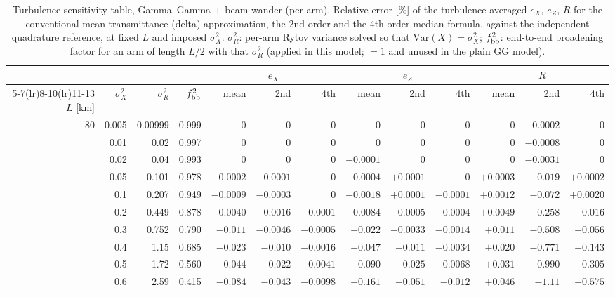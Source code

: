 \documentclass[11pt,a4paper]{article}
\begin{document}
\begin{table}[htbp]
\centering\scriptsize
\caption{Turbulence-sensitivity table, Gamma--Gamma + beam wander (per arm). Relative error [\%] of the turbulence-averaged $e_X$, $e_Z$, $R$ for the conventional mean-transmittance (delta) approximation, the 2nd-order and the 4th-order median formula, against the independent quadrature reference, at fixed $L$ and imposed $\sigma_X^2$. $\sigma_R^2$: per-arm Rytov variance solved so that $\mathrm{Var}(X)=\sigma_X^2$; $f_{\rm bb}^2$: end-to-end broadening factor for an arm of length $L/2$ with that $\sigma_R^2$ (applied in this model; $=1$ and unused in the plain GG model).}
\label{tab:sens-GGBB}
\begin{tabular}{rrrrrrrrrrrrr}
\toprule
 & & & & \multicolumn{3}{c}{$e_X$} & \multicolumn{3}{c}{$e_Z$} & \multicolumn{3}{c}{$R$}\\
\cmidrule(lr){5-7}\cmidrule(lr){8-10}\cmidrule(lr){11-13}
$L$ [km] & $\sigma_X^2$ & $\sigma_R^2$ & $f_{\rm bb}^2$ & mean & 2nd & 4th & mean & 2nd & 4th & mean & 2nd & 4th\\
\midrule
80 & 0.005 & 0.00999 & 0.999 & $0$ & $0$ & $0$ & $0$ & $0$ & $0$ & $0$ & $-0.0002$ & $0$ \\
 & 0.01 & 0.02 & 0.997 & $0$ & $0$ & $0$ & $0$ & $0$ & $0$ & $0$ & $-0.0008$ & $0$ \\
 & 0.02 & 0.04 & 0.993 & $0$ & $0$ & $0$ & $-0.0001$ & $0$ & $0$ & $0$ & $-0.0031$ & $0$ \\
 & 0.05 & 0.101 & 0.978 & $-0.0002$ & $-0.0001$ & $0$ & $-0.0004$ & $+0.0001$ & $0$ & $+0.0003$ & $-0.019$ & $+0.0002$ \\
 & 0.1 & 0.207 & 0.949 & $-0.0009$ & $-0.0003$ & $0$ & $-0.0018$ & $+0.0001$ & $-0.0001$ & $+0.0012$ & $-0.072$ & $+0.0020$ \\
 & 0.2 & 0.449 & 0.878 & $-0.0040$ & $-0.0016$ & $-0.0001$ & $-0.0084$ & $-0.0005$ & $-0.0004$ & $+0.0049$ & $-0.258$ & $+0.016$ \\
 & 0.3 & 0.752 & 0.790 & $-0.011$ & $-0.0046$ & $-0.0005$ & $-0.022$ & $-0.0033$ & $-0.0014$ & $+0.011$ & $-0.508$ & $+0.056$ \\
 & 0.4 & 1.15 & 0.685 & $-0.023$ & $-0.010$ & $-0.0016$ & $-0.047$ & $-0.011$ & $-0.0034$ & $+0.020$ & $-0.771$ & $+0.143$ \\
 & 0.5 & 1.72 & 0.560 & $-0.044$ & $-0.022$ & $-0.0041$ & $-0.090$ & $-0.025$ & $-0.0068$ & $+0.031$ & $-0.990$ & $+0.305$ \\
 & 0.6 & 2.59 & 0.415 & $-0.084$ & $-0.043$ & $-0.0098$ & $-0.161$ & $-0.051$ & $-0.012$ & $+0.046$ & $-1.11$ & $+0.575$ \\

\end{tabular}
\end{table}
\end{document}
